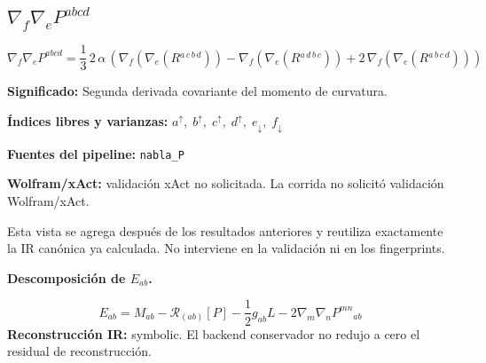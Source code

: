 \documentclass[11pt]{article}
\begin{document}
\subsection*{$ \nabla_f\nabla_e P^{abcd} $}
\begin{dmath*}[breakdepth={5}]
\nabla_f\nabla_e P^{abcd} = \frac{1}{3}\,2\,\alpha\,\left(\nabla_{f}\!\left(\nabla_{e}\!\left(R{}^{a\,c\,b\,d}\right)\right) - \nabla_{f}\!\left(\nabla_{e}\!\left(R{}^{a\,d\,b\,c}\right)\right) + 2\,\nabla_{f}\!\left(\nabla_{e}\!\left(R{}^{a\,b\,c\,d}\right)\right)\right)
\end{dmath*}
\par\vspace{1.2\baselineskip}\noindent
\begin{minipage}{\linewidth}
\textbf{Significado:} Segunda derivada covariante del momento de curvatura.\par
\textbf{Índices libres y varianzas:} $ a^{\uparrow},\;b^{\uparrow},\;c^{\uparrow},\;d^{\uparrow},\;e_{\downarrow},\;f_{\downarrow} $\par
\textbf{Fuentes del pipeline:} \texttt{nabla\_P}\par
\textbf{Wolfram/xAct:} validación xAct no solicitada. La corrida no solicitó validación Wolfram/xAct.\par
\end{minipage}
\par\bigskip{}\par
Esta vista se agrega después de los resultados anteriores y reutiliza exactamente la IR canónica ya calculada. No interviene en la validación ni en los fingerprints.\par
{}
\par\medskip\noindent\textbf{Descomposición de $ E_{ab} $.}\par
\begin{dmath*}[breakdepth={5}]
E_{ab}=M_{ab}-\mathcal{R}_{(ab)}[P]-\frac{1}{2}g_{ab}L-2\nabla_m\nabla_nP^{mn}{}_{ab}
\end{dmath*}
\textbf{Reconstrucción IR:} symbolic. El backend conservador no redujo a cero el residual de reconstrucción.\par
\end{document}
